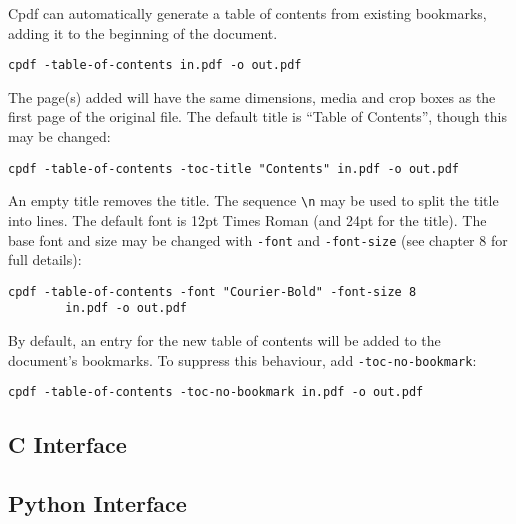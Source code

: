 \documentclass{book}
\begin{document}
Cpdf can automatically generate a table of contents from existing bookmarks, adding it to the beginning of the document.

  \begin{framed}
   \small\verb!cpdf -table-of-contents in.pdf -o out.pdf!
  \end{framed}

The page(s) added will have the same dimensions, media and crop boxes as the first page of the original file. The default title is ``Table of Contents'', though this may be changed:

  \begin{framed}
   \small\verb!cpdf -table-of-contents -toc-title "Contents" in.pdf -o out.pdf!
  \end{framed}

An empty title removes the title. The sequence \texttt{\textbackslash n} may be used to split the title into lines. The default font is 12pt Times Roman (and 24pt for the title). The base font and size may be changed with \texttt{-font} and \texttt{-font-size} (see chapter 8 for full details):

  \begin{framed}
   \small\verb!cpdf -table-of-contents -font "Courier-Bold" -font-size 8!\\
   \small\verb!        in.pdf -o out.pdf!
  \end{framed}

By default, an entry for the new table of contents will be added to the document's bookmarks. To suppress this behaviour, add \texttt{-toc-no-bookmark}:

  \begin{framed}
   \small\verb!cpdf -table-of-contents -toc-no-bookmark in.pdf -o out.pdf!
  \end{framed}



\clearpage\pagestyle{empty}

\begin{cpdflib}
\clearpage
\section*{C Interface}
\begin{small}\tt

\end{small}
\end{cpdflib}

\begin{pycpdflib}
\clearpage
\section*{Python Interface}
\begin{small}\tt

\end{small}
\end{pycpdflib}
\end{document}
